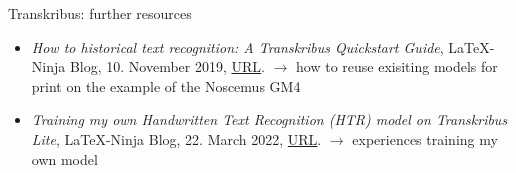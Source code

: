 \begin{frame}{Transkribus: further resources}
    \begin{itemize}
        \item \emph{How to historical text recognition: A Transkribus Quickstart Guide}, \LaTeX{}-Ninja Blog, 10. November 2019, \href{https://latex-ninja.com/2019/11/10/how-to-historical-text-recognition-a-transkribus-quickstart-guide/}{URL}. \alert{$\to$ how to reuse exisiting models for print on the example of the Noscemus GM4}
        \item \emph{Training my own Handwritten Text Recognition (HTR) model on Transkribus Lite}, \LaTeX{}-Ninja Blog, 22. March 2022, \href{https://latex-ninja.com/2022/03/22/training-my-own-handwritten-text-recognition-htr-model-on-transkribus-lite/}{URL}. \alert{$\to$ experiences training my own model}
    \end{itemize}
\end{frame}

